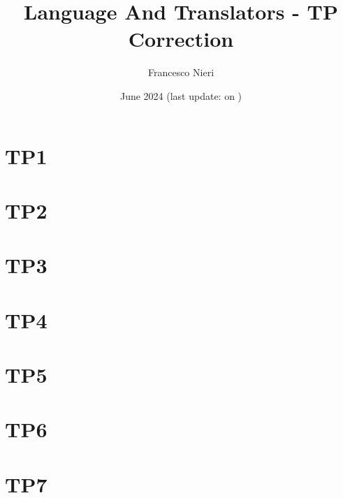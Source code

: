 \documentclass{article}
\title{Language And Translators - TP Correction}
\author{Francesco Nieri}
\date{June 2024 (last update: \commitHash on \commitDate)}
\begin{document}
\maketitle
\tableofcontents
\newpage
\section{TP1}
    
\newpage
\section{TP2}
    
\newpage
\section{TP3}
    
\newpage
\section{TP4}
    
\newpage
\section{TP5}
    
\newpage
\section{TP6}
    
\newpage
\section{TP7}
    
\end{document}
